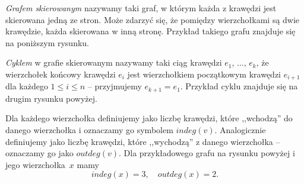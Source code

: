 


\noindent
\textit{Grafem skierowanym} nazywamy taki graf, w którym każda z krawędzi jest skierowana jedną ze stron. Może zdarzyć się, że pomiędzy wierzchołkami są dwie krawędzie, każda skierowana w inną stronę. Przykład takiego grafu znajduje się na poniższym rysunku.

\begin{center}
	\hspace{40px}
\end{center}

\noindent
\textit{Cyklem} w grafie skierowanym nazywamy taki ciąg krawędzi $e_1$, ..., $e_k$, że wierzchołek końcowy krawędzi $e_i$ jest wierzchołkiem początkowym krawędzi $e_{i + 1}$ dla każdego ${1 \leqslant i \leqslant n}$ -- przyjmujemy $e_{k + 1} = e_1$. Przykład cyklu znajduje się na drugim rysunku powyżej.

\vspace{5px}

\noindent
Dla każdego wierzchołka definiujemy  jako liczbę krawędzi, które ,,wchodzą'' do danego wierzchołka i oznaczamy go symbolem $indeg(v)$. Analogicznie definiujemy  jako liczbę krawędzi, które ,,wychodzą'' z danego wierzchołka -- oznaczamy go jako $outdeg(v)$. Dla przykładowego grafu na rysunku powyżej i jego wierzchołka~$x$ mamy
\[
	indeg(x) = 3,  \quad outdeg(x) = 2.
\]


